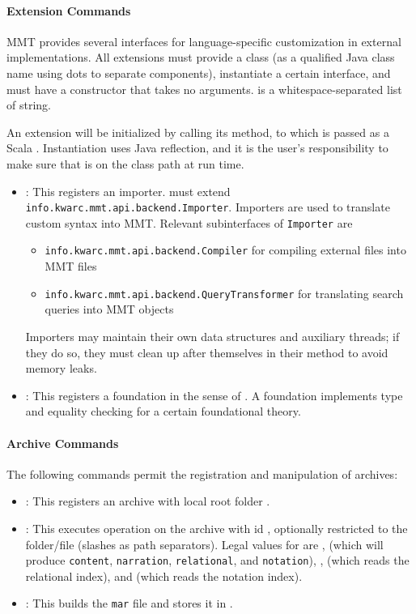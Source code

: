 \paragraph{Extension Commands}
MMT provides several interfaces for language-specific customization in external implementations. All extensions must provide a class  (as a qualified Java class name using dots to separate components), instantiate a certain interface, and must have a constructor that takes no arguments.  is a whitespace-separated list of string.

An extension will be initialized by calling its  method, to which  is passed as a Scala . Instantiation uses Java reflection, and it is the user's responsibility to make sure that  is on the class path at run time.

\begin{itemize}
\item {}: This registers an importer.  must extend \texttt{info.kwarc.mmt.api.backend.Importer}. Importers are used to translate custom syntax into MMT. Relevant subinterfaces of \texttt{Importer} are
  \begin{itemize}
    \item \texttt{info.kwarc.mmt.api.backend.Compiler} for compiling external files into MMT files
    \item \texttt{info.kwarc.mmt.api.backend.QueryTransformer} for translating search queries into MMT objects
  \end{itemize}
Importers may maintain their own data structures and auxiliary threads; if they do so, they must clean up after themselves in their  method to avoid memory leaks.
\item {}: This registers a foundation in the sense of \cite{RK:mmt:10}. A foundation implements type and equality checking for a certain foundational theory.
\end{itemize}

\paragraph{Archive Commands}
The following commands permit the registration and manipulation of archives:

\begin{itemize}
\item {}: This registers an archive with local root folder .
\item {}: This executes operation  on the archive with id , optionally restricted to the folder/file  (slashes as path separators). Legal values for  are ,  (which will produce \texttt{content}, \texttt{narration}, \texttt{relational}, and \texttt{notation}), ,  (which reads the relational index), and  (which reads the notation index).
\item {}: This builds the \texttt{mar} file and stores it in .
\end{itemize}

